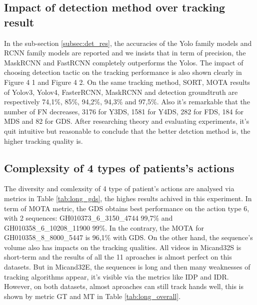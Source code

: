 \subsection{Impact of detection method over tracking result}
In the sub-section \ref{subsec:det_res}, the accuracies of the Yolo family models and RCNN family models are reported and we insists that in term of precision, the MaskRCNN and FastRCNN completely outperforms the Yolos. The impact of choosing detection tactic on the tracking performance is also shown clearly in Figure 4 1 and Figure 4 2. On the same tracking method, SORT, MOTA results of Yolov3, Yolov4, FasterRCNN, MaskRCNN and detection groundtruth are respectively 74,1\%, 85\%, 94,2\%, 94,3\% and 97,5\%. Also it’s remarkable that the number of FN decreases, 3176 for Y3DS, 1581 for Y4DS, 282 for FDS, 184 for MDS and 82 for GDS. After researching theory and evaluating experiments, it’s quit intuitive but reasonable to conclude that the better detction method is, the higher tracking quality is.
\subsection{Complexsity of 4 types of patients's actions}
The diversity and comlexsity of 4 type of patient’s actions are analysed via metrics in Table \ref{tab:long_gds}, the highes results achived in this experiment. In term of MOTA metric, the GDS obtains best performance on the action type 6, with 2 sequences:  GH010373\_6\_3150\_4744 99,7\% and GH010358\_6\_10208\_11900 99\%. In the contrary, the MOTA for GH010358\_8\_8000\_5447 is 96,1\% with GDS.
On the other hand, the sequence’s volume also has impacts on the tracking qualities. All videos in Micand32S is short-term and the results of all the 11 aproaches is almost perfect on this datasets. But in Micand32E, the sequences is long and then many weaknesses of tracking algorithms appear, it’s visible via the metrics like IDP and IDR. However, on both datasets, almost aproaches can still track hands well, this is shown by metric GT and MT in Table \ref{tab:long_overall}.
